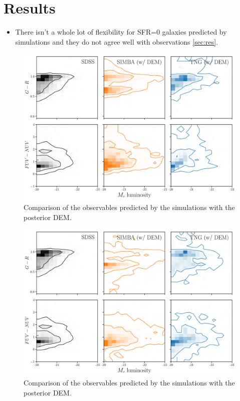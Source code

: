 \section{Results} \label{sec:results}

\begin{itemize}
\item There isn't a whole lot of flexibility for SFR=0 galaxies predicted by
simulations and they do not agree well with observations \ref{sec:res}. 
\end{itemize}

\begin{figure}
\begin{center}
    \includegraphics[width=\textwidth]{figs/abc_observables.pdf}
    \caption{Comparison of the observables predicted by the simulations with
    the posterior DEM.}
\label{fig:dem}
\end{center}
\end{figure}

\begin{figure}
\begin{center}
    \includegraphics[width=\textwidth]{figs/abc_tnorm_observables.pdf}
    \caption{Comparison of the observables predicted by the simulations with
    the posterior DEM.}
\label{fig:dem}
\end{center}
\end{figure}


